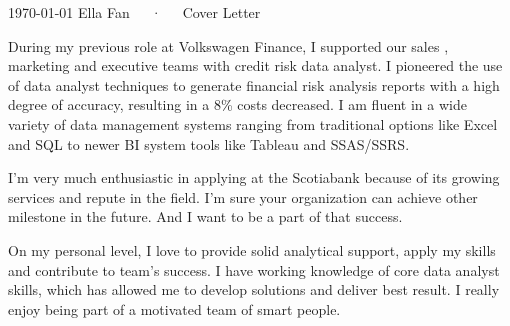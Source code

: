 \documentclass[11pt, a4paper]{awesome-cv}
\begin{document}
\makecvheader[R]

\makecvfooter
  {\today}
  {Ella Fan~~~·~~~Cover Letter}
  {}

\makelettertitle

\begin{cvletter}

During my previous role at Volkswagen Finance, I supported our sales , marketing and executive teams with credit risk data analyst. I pioneered the use of data analyst techniques to generate financial risk analysis reports with a high degree of accuracy, resulting in a 8\% costs decreased. I am fluent in a wide variety of data management systems ranging from traditional options like Excel and SQL to newer BI system tools like Tableau and SSAS/SSRS.

I'm very much enthusiastic in applying at the Scotiabank because of its growing services and repute in the field. I'm sure your organization can achieve other milestone in the future. And I want to be a part of that success.

On my personal level, I love to provide solid analytical support, apply my skills and contribute to team's success. I have working knowledge of core data analyst skills, which has allowed me to develop solutions and deliver best result. I really enjoy being part of a motivated team of smart people.

\end{cvletter}


\makeletterclosing
\end{document}
